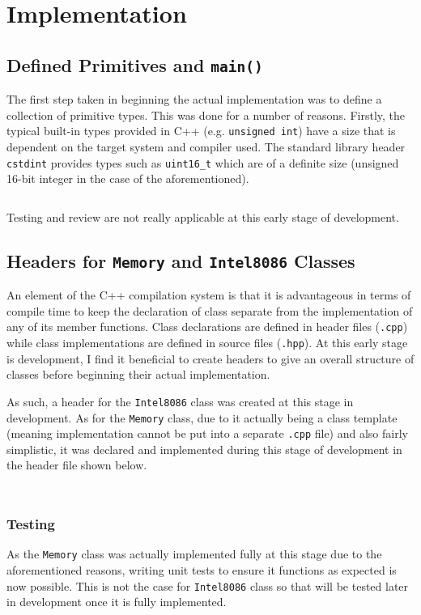 \section{Implementation}

\subsection{Defined Primitives and \texttt{main()}}
    The first step taken in beginning the actual implementation was to define a collection of primitive types. This was done for a number of reasons. Firstly, the typical built-in types provided in C++ (e.g. \texttt{unsigned int}) have a size that is dependent on the target system and compiler used. The standard library header \texttt{cstdint} provides types such as \texttt{uint16\_t} which are of a definite size (unsigned 16-bit integer in the case of the aforementioned).

    \inputminted{c++}{code/primitives.hpp}

    Testing and review are not really applicable at this early stage of development.

\subsection{Headers for \texttt{Memory} and \texttt{Intel8086} Classes}
    An element of the C++ compilation system is that it is advantageous in terms of compile time to keep the declaration of class separate from the implementation of any of its member functions. Class declarations are defined in header files (\texttt{.cpp}) while class implementations are defined in source files (\texttt{.hpp}). At this early stage is development, I find it beneficial to create headers to give an overall structure of classes before beginning their actual implementation.

    As such, a header for the \texttt{Intel8086} class was created at this stage in development. As for the \texttt{Memory} class, due to it actually being a class template (meaning implementation cannot be put into a separate \texttt{.cpp} file) and also fairly simplistic, it was declared and implemented during this stage of development in the header file shown below.

    \inputminted{c++}{code/memory.hpp}

    \inputminted{c++}{code/intel8086.hpp}

    \subsubsection{Testing}
        As the \texttt{Memory} class was actually implemented fully at this stage due to the aforementioned reasons, writing unit tests to ensure it functions as expected is now possible. This is not the case for \texttt{Intel8086} class so that will be tested later in development once it is fully implemented.

